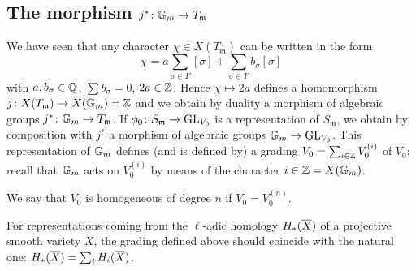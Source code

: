 \subsection{The morphism \texorpdfstring{$j^* \colon \mathbb{G}_m \to
T_{\mathfrak{m}}$}{j*: Gm -> Tm}}
\label{sec:II_32}
We have seen that any character $\chi \in X(T_\mathfrak{m})$ can be written in 
the form
\[
	\chi = a \sum_{\sigma \in \Gamma} [\sigma] + \sum_{\sigma \in \Gamma} 
	b_{\sigma}[\sigma]
\]
with $a, b_\sigma \in \mathbb{Q}$, $\sum b_{\sigma} = 0$, $2a \in \mathbb{Z}$. Hence $\chi 
\mapsto 2a$ defines a homomorphism $j \colon X(T_\mathfrak{m}) \to X(\mathbb{G}_m) = 
\mathbb{Z}$ and we obtain by duality a morphism of algebraic groups $j^{*} \colon \mathbb{G}_m 
\to T_\mathfrak{m}$. If $\phi_0 \colon S_\mathfrak{m} \to \operatorname{GL}_{V_0}$ is a 
representation of $S_\mathfrak{m}$, we obtain by composition with $j^{*}$ a 
morphism of algebraic groups $\mathbb{G}_m \to \operatorname{GL}_{V_0}$. This representation of 
$\mathbb{G}_m$ defines (and is defined by) a grading $V_0 = \sum_{i \in \mathbb{Z}} V_0^{(i)}$ 
of $V_0$; recall that $\mathbb{G}_m$ acts on $V_0^{(i)}$ by means of the character $i 
\in \mathbb{Z} = X(\mathbb{G}_m)$.

We say that $V_0$ is homogeneous of degree $n$ if $V_0 = V_0^{(n)}$.
\dpage
\begin{obs}
For representations coming from the $\ell$-adic homology $H_{*}(\overline{X})$ of 
a projective smooth variety $X$, the grading defined above should coincide with 
the natural one: $H_{*}(\overline{X}) = \sum_i H_i(\overline{X})$.
\end{obs}
